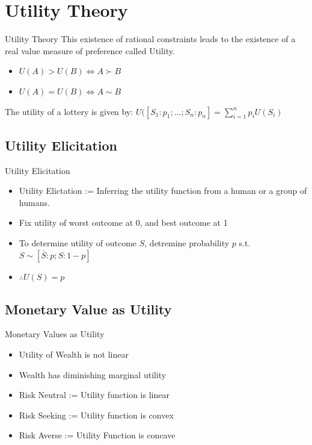 \documentclass{beamer}
\begin{document}
\section{Utility Theory}
\begin{frame}{Utility Theory}
This existence of rational constraints leads to the existence of a real value measure of preference called Utility. 
\begin{itemize}
    \item $U(A) > U(B) \iff A \succ B$
    \item $U(A) = U(B) \iff A \sim B$
\end{itemize}
The utility of a lottery is given by:
$U([S_1:p_1; ... ; S_n:p_n] = \sum_{i=1}^{n} p_{i}U(S_i)$
\end{frame}

\subsection{Utility Elicitation}
\begin{frame}{Utility Elicitation}
\begin{itemize}
    \item Utility Elictation := Inferring the utility function from a human or a group of humans. 
    \item Fix utility of worst outcome at 0, and best outcome at 1
    \item To determine utility of outcome $S$, detremine probability $p$ s.t. $S \sim [\bar{S}:p;S:1-p]$
    \item $\therefore U(S) = p$
\end{itemize}
\end{frame}

\subsection{Monetary Value as Utility}
\begin{frame}{Monetary Values as Utility}
\begin{itemize}
   \item Utility of Wealth is not linear 
   \item Wealth has diminishing marginal utility
   \item Risk Neutral := Utility function is linear
   \item Risk Seeking := Utility function is convex
   \item Risk Averse := Utility Function is concave
\end{itemize}
\end{frame}
\end{document}
